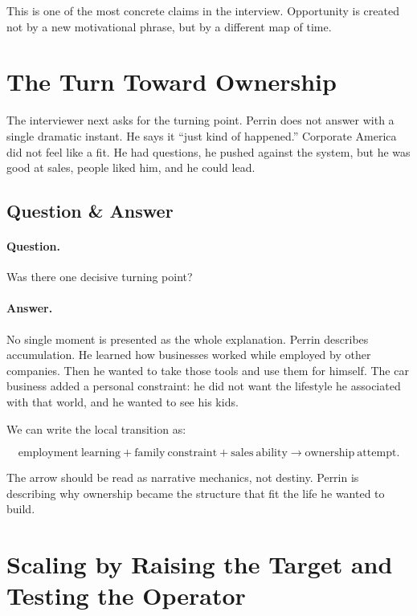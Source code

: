 This is one of the most concrete claims in the interview. Opportunity is created not by a new motivational phrase, but by a different map of time.

\section{The Turn Toward Ownership}

The interviewer next asks for the turning point. Perrin does not answer with a single dramatic instant. He says it ``just kind of happened.'' Corporate America did not feel like a fit. He had questions, he pushed against the system, but he was good at sales, people liked him, and he could lead.

\subsection{Question \& Answer}

\paragraph{Question.}
Was there one decisive turning point?

\paragraph{Answer.}
No single moment is presented as the whole explanation. Perrin describes accumulation. He learned how businesses worked while employed by other companies. Then he wanted to take those tools and use them for himself. The car business added a personal constraint: he did not want the lifestyle he associated with that world, and he wanted to see his kids.

We can write the local transition as:

\begin{equation}
\mathrm{employment\ learning}
+
\mathrm{family\ constraint}
+
\mathrm{sales\ ability}
\longrightarrow
\mathrm{ownership\ attempt}.
\end{equation}

The arrow should be read as narrative mechanics, not destiny. Perrin is describing why ownership became the structure that fit the life he wanted to build.

\section{Scaling by Raising the Target and Testing the Operator}

